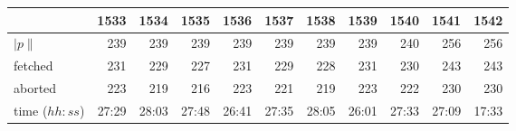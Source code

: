\begin{tabular}{lrrrrrrrrrr} 
 &\textsc{1533} &\textsc{1534} &\textsc{1535} &\textsc{1536} &\textsc{1537} &\textsc{1538} &\textsc{1539} &\textsc{1540} &\textsc{1541} &\textsc{1542}\\ 
\midrule 
 $|p\|$ &239 &239 &239 &239 &239 &239 &239 &240 &256 &256\\
 fetched&231 &229 &227 &231 &229 &228 &231 &230 &243 &243\\
 aborted&223 &219 &216 &223 &221 &219 &223 &222 &230 &230\\
 time ($hh:ss$)&27:29 &28:03 &27:48 &26:41 &27:35 &28:05 &26:01 &27:33 &27:09 &17:33\\
\bottomrule 
\end{tabular} 
